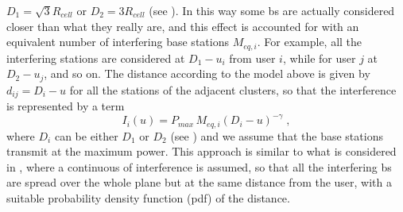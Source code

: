 $D_{1}=\sqrt{3}R_{cell}$ or $D_2=3R_{cell}$ (see ).
In this way some \gls{bs} are actually considered closer than what they really are, and this effect is accounted for with an equivalent number of interfering base stations $M_{eq,i}$. For example, all the interfering stations are considered at $D_1-u_i$ from user $i$, while for user $j$ at $D_2-u_j$, and so on. 
The distance according to the model above is given by $d_{ij}=D_i-u$ for all the stations of the adjacent clusters, so that the interference is represented by a term
\begin{equation}
      I_i(u) = P_{max}\, M_{eq, i}\left(D_i-u\right)^{-\gamma}\;,\label{interference_u}
\end{equation}
where $D_i$ can be either $D_1$ or $D_2$ (see ) and we assume that the base stations transmit at the maximum power.
This approach is similar to what is considered in \cite{cheikh11}, where a continuous of interference is assumed, so that all the interfering \gls{bs} are spread over the whole plane but at the same distance from the user, with a suitable probability density function (pdf) of the distance.

